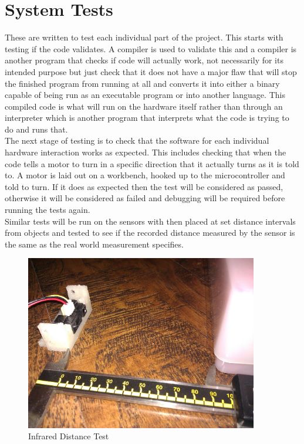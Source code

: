 \section{System Tests}
These are written to test each individual part of the project.  This starts with testing if the code validates.  A compiler is used to validate this and a compiler is another program that checks if code will actually work, not necessarily for its intended purpose but just check that it does not have a major flaw that will stop the finished program from running at all and converts it into either a binary capable of being run as an executable program or into another language.  This compiled code is what will run on the hardware itself rather than through an interpreter which is another program that interprets what the code is trying to do and runs that.
\\The next stage of testing is to check that the software for each individual hardware interaction works as expected.  This includes checking that when the code tells a motor to turn in a specific direction that it actually turns as it is told to.  A motor is laid out on a workbench, hooked up to the microcontroller and told to turn.  If it does as expected then the test will be considered as passed, otherwise it will be considered as failed and debugging will be required before running the tests again.
\\Similar tests will be run on the sensors with then placed at set distance intervals from objects and tested to see if the recorded distance measured by the sensor is the same as the real world measurement specifies.
\begin{figure}[h]
\centering
        \includegraphics[width=4.0in] {Images/ir-measure-2.jpg}
        \caption{Infrared Distance Test}
        \label{Infrared Distance Test}
\end{figure}
